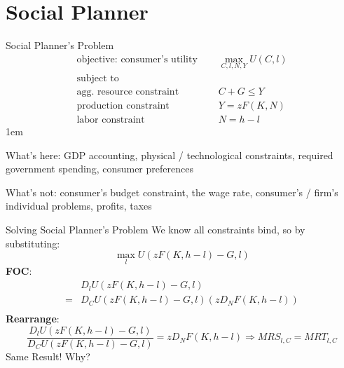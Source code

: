 \documentclass[11pt,aspectratio=43]{beamer}
\let\olditemize=\itemize
\let\endolditemize=\enditemize
\renewenvironment{itemize}{\olditemize \itemsep1em}{\endolditemize}
\theoremstyle{definition}
\begin{document}
\section{Social Planner}
\label{sec:Social_Planner_s_Problem}

\begin{frame}{Social Planner's Problem}
\label{slide:Social_Planner_s_Problem}
    \begin{align*}
        \text{objective: consumer's utility } \quad
            & \max_{C, l, N, Y} U( C, l )
        \\
        \text{subject to} \quad
            &
        \\
        \text{agg. resource constraint} \quad
            &  C + G \le Y
        \\
        \text{production constraint} \quad
            & Y = z F( K, N )
        \\
        \text{labor constraint} \quad
            & N = h - l
    \end{align*}
    \begin{itemize}
        \item \alert{What’s here}: GDP accounting, physical / technological constraints, required government spending, consumer preferences
        \item \alert{What's not}: consumer’s budget constraint, the wage rate, consumer’s / firm’s individual problems, profits, taxes
    \end{itemize}
\end{frame}

\begin{frame}{Solving Social Planner's Problem}
\label{slide:Solving_Social_Planner_s_Problem}
    We know all constraints bind, so by substituting:
    \begin{equation}
    \label{eq:SPPSolve}
        \max_{l} U( z F( K, h-l ) - G, l )
    \end{equation}
    \textbf{FOC}:
    \begin{equation}
    \label{eq:SPPFOC}
        \begin{split}
                & D_{l} U( z F( K, h-l ) - G, l)
            \\
               = &  D_{C}U( z F( K, h-l ) - G, l ) ( z D_{N} F( K, h-l ) )
            \\
        \end{split}
    \end{equation}
    \textbf{Rearrange}:
    \begin{equation}
    \label{eq:SPPRearrange}
        \frac{D_{l} U( z F( K, h-l ) - G, l)}{D_{C}U( z F( K, h-l ) - G, l )} = z D_{N} F( K, h-l ) \Rightarrow MRS_{l, C}  = MRT_{l, C}
    \end{equation}
    Same Result! Why?
\end{frame}
\end{document}
